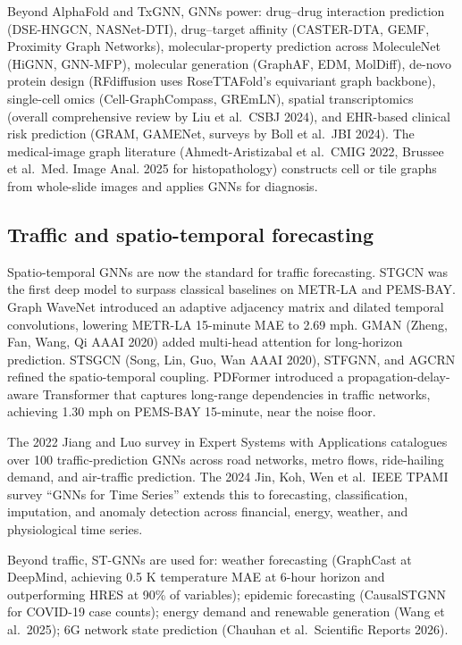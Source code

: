 \documentclass{article}
\begin{document}
Beyond AlphaFold and TxGNN, GNNs power: drug--drug interaction prediction (DSE-HNGCN, NASNet-DTI), drug--target affinity (CASTER-DTA, GEMF, Proximity Graph Networks), molecular-property prediction across MoleculeNet (HiGNN, GNN-MFP), molecular generation (GraphAF, EDM, MolDiff), de-novo protein design (RFdiffusion uses RoseTTAFold's equivariant graph backbone), single-cell omics (Cell-GraphCompass, GREmLN), spatial transcriptomics (overall comprehensive review by Liu et al.~CSBJ 2024), and EHR-based clinical risk prediction (GRAM, GAMENet, surveys by Boll et al.~JBI 2024). The medical-image graph literature (Ahmedt-Aristizabal et al.~CMIG 2022, Brussee et al.~Med. Image Anal. 2025 for histopathology) constructs cell or tile graphs from whole-slide images and applies GNNs for diagnosis.

\subsection{Traffic and spatio-temporal forecasting}\label{traffic-and-spatio-temporal-forecasting}

Spatio-temporal GNNs are now the standard for traffic forecasting. STGCN \citep{yu2018spatiotemporalgrap} was the first deep model to surpass classical baselines on METR-LA and PEMS-BAY. Graph WaveNet \citep{wu2019graphwavenetfordee} introduced an adaptive adjacency matrix and dilated temporal convolutions, lowering METR-LA 15-minute MAE to 2.69 mph. GMAN (Zheng, Fan, Wang, Qi AAAI 2020) added multi-head attention for long-horizon prediction. STSGCN (Song, Lin, Guo, Wan AAAI 2020), STFGNN, and AGCRN refined the spatio-temporal coupling. PDFormer \citep{jiang2022graphneuralnetwork} introduced a propagation-delay-aware Transformer that captures long-range dependencies in traffic networks, achieving 1.30 mph on PEMS-BAY 15-minute, near the noise floor.

The 2022 Jiang and Luo survey in Expert Systems with Applications catalogues over 100 traffic-prediction GNNs across road networks, metro flows, ride-hailing demand, and air-traffic prediction. The 2024 Jin, Koh, Wen et al.~IEEE TPAMI survey ``GNNs for Time Series'' extends this to forecasting, classification, imputation, and anomaly detection across financial, energy, weather, and physiological time series.

Beyond traffic, ST-GNNs are used for: weather forecasting (GraphCast at DeepMind, achieving 0.5 K temperature MAE at 6-hour horizon and outperforming HRES at 90\% of variables); epidemic forecasting (CausalSTGNN for COVID-19 case counts); energy demand and renewable generation (Wang et al.~2025); 6G network state prediction (Chauhan et al.~Scientific Reports 2026).
\end{document}
